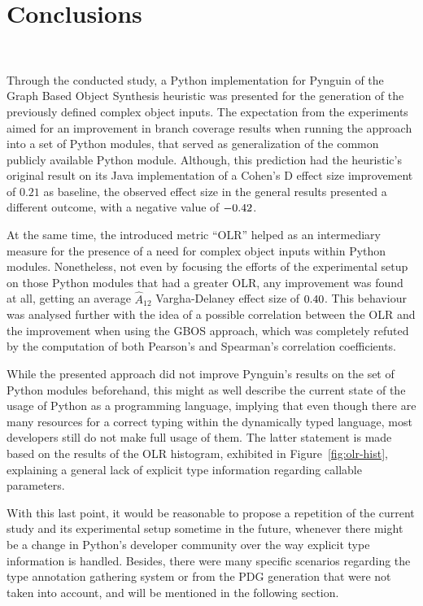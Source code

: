 \documentclass[%
  chapterprefix=false,%
  open=right,%
  twoside=true,%
  paper=a4,%
  logofile={Figures/logo.png},%
  thesistype=master,%
  UKenglish,%
]{se2thesis}
\begin{document}
\chapter{Conclusions}~\label{chap:conclusions}

Through the conducted study, a Python implementation for Pynguin of the Graph Based Object Synthesis heuristic was presented for the generation of the previously defined complex object inputs.
The expectation from the experiments aimed for an improvement in branch coverage results when running the approach into a set of Python modules, that served as generalization of the common publicly available Python module.
Although, this prediction had the heuristic's original result on its Java implementation of a Cohen's D effect size improvement of \(0.21\) as baseline, the observed effect size in the general results presented a different outcome, with a negative value of \(-0.42\).

At the same time, the introduced metric ``OLR'' helped as an intermediary measure for the presence of a need for complex object inputs within Python modules. 
Nonetheless, not even by focusing the efforts of the experimental setup on those Python modules that had a greater OLR, any improvement was found at all, getting an average \(\hat{A}_{12}\) Vargha-Delaney effect size of \(0.40\).
This behaviour was analysed further with the idea of a possible correlation between the OLR and the improvement when using the GBOS approach, which was completely refuted by the computation of both Pearson's and Spearman's correlation coefficients.

While the presented approach did not improve Pynguin's results on the set of Python modules beforehand, this might as well describe the current state of the usage of Python as a programming language, implying that even though there are many resources for a correct typing within the dynamically typed language, most developers still do not make full usage of them.
The latter statement is made based on the results of the OLR histogram, exhibited in Figure~\ref{fig:olr-hist}, explaining a general lack of explicit type information regarding callable parameters.

With this last point, it would be reasonable to propose a repetition of the current study and its experimental setup sometime in the future, whenever there might be a change in Python's developer community over the way explicit type information is handled.
Besides, there were many specific scenarios regarding the type annotation gathering system or from the PDG generation that were not taken into account, and will be mentioned in the following section.
\end{document}
